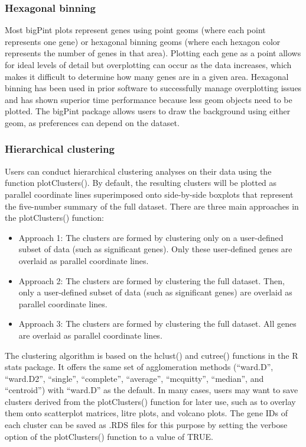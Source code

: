\documentclass[parskip=full]{bmcart} %
\begin{document}
\subsubsection*{Hexagonal binning}

Most bigPint plots represent genes using point geoms (where each point represents one gene) or hexagonal binning geoms (where each hexagon color represents the number of genes in that area). Plotting each gene as a point allows for ideal levels of detail but overplotting can occur as the data increases, which makes it difficult to determine how many genes are in a given area. Hexagonal binning has been used in prior software to successfully manage overplotting issues \cite{carr1987scatterplot, harshbarger2017deiva} and has shown superior time performance because less geom objects need to be plotted. The bigPint package allows users to draw the background using either geom, as preferences can depend on the dataset.

\subsubsection*{Hierarchical clustering}

Users can conduct hierarchical clustering analyses on their data using the function plotClusters(). By default, the resulting clusters will be plotted as parallel coordinate lines superimposed onto side-by-side boxplots that represent the five-number summary of the full dataset. There are three main approaches in the plotClusters() function:

\begin{itemize}  
\item Approach 1: The clusters are formed by clustering only on a user-defined subset of data (such as significant genes). Only these user-defined genes are overlaid as parallel coordinate lines. 
\item Approach 2: The clusters are formed by clustering the full dataset. Then, only a user-defined subset of data (such as significant genes) are overlaid as parallel coordinate lines.
\item Approach 3: The clusters are formed by clustering the full dataset. All genes are overlaid as parallel coordinate lines.
\end{itemize}

The clustering algorithm is based on the hclust() and cutree() functions in the R stats package. It offers the same set of agglomeration methods (``ward.D'', ``ward.D2'', ``single'', ``complete'', ``average'', ``mcquitty'', ``median'', and ``centroid'') with ``ward.D'' as the default. In many cases, users may want to save clusters derived from the plotClusters() function for later use, such as to overlay them onto scatterplot matrices, litre plots, and volcano plots. The gene IDs of each cluster can be saved as .RDS files for this purpose by setting the verbose option of the plotClusters() function to a value of TRUE.
\end{document}
